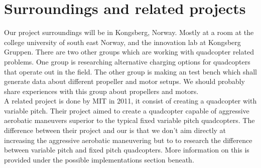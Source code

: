 \section{Surroundings and related projects}

Our project surroundings will be in Kongsberg, Norway. Mostly at a room at the college university of south east Norway, and the innovation lab at Kongsberg Gruppen.
\newline
There are two other groups which are working with quadcopter related problems. One group is researching alternative charging options for quadcopters that operate out in the field. The other group is making an test bench which shall generate data about different propeller and motor setups. We should probably share experiences with this group about propellers and motors.\\
\newline
A related project is done by MIT in 2011, it consist of creating a quadcopter with variable pitch. Their project aimed to create a quadcopter capable of  aggressive aerobatic maneuvers superior to the typical fixed variable pitch quadcopters. 
\newline
The difference between their project and our is that we don’t aim directly at increasing the aggressive aerobatic maneuvering but to to research the difference between variable pitch and fixed pitch quadcopters.
\newline
More information on this is provided under the possible implementations section beneath.